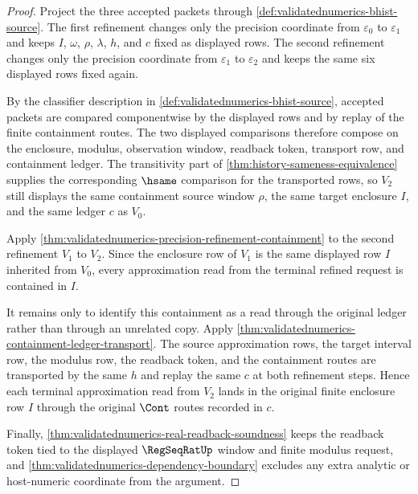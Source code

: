 \begin{proof}
Project the three accepted packets through
\autoref{def:validatednumerics-bhist-source}. The first refinement changes
only the precision coordinate from $\varepsilon_0$ to $\varepsilon_1$ and
keeps $I$, $\omega$, $\rho$, $\lambda$, $h$, and $c$ fixed as displayed rows.
The second refinement changes only the precision coordinate from
$\varepsilon_1$ to $\varepsilon_2$ and keeps the same six displayed rows
fixed again.

By the classifier description in
\autoref{def:validatednumerics-bhist-source}, accepted packets are compared
componentwise by the displayed rows and by replay of the finite containment
routes. The two displayed comparisons therefore compose on the enclosure,
modulus, observation window, readback token, transport row, and containment
ledger. The transitivity part of
\autoref{thm:history-sameness-equivalence} supplies the corresponding
$\hsame$ comparison for the transported rows, so $V_2$ still displays the
same containment source window $\rho$, the same target enclosure $I$, and the
same ledger $c$ as $V_0$.

Apply \autoref{thm:validatednumerics-precision-refinement-containment} to the
second refinement $V_1$ to $V_2$. Since the enclosure row of $V_1$ is the
same displayed row $I$ inherited from $V_0$, every approximation read from
the terminal refined request is contained in $I$.

It remains only to identify this containment as a read through the original
ledger rather than through an unrelated copy. Apply
\autoref{thm:validatednumerics-containment-ledger-transport}. The source
approximation rows, the target interval row, the modulus row, the readback
token, and the containment routes are transported by the same $h$ and replay
the same $c$ at both refinement steps. Hence each terminal approximation read
from $V_2$ lands in the original finite enclosure row $I$ through the
original $\Cont$ routes recorded in $c$.

Finally, \autoref{thm:validatednumerics-real-readback-soundness} keeps the
readback token tied to the displayed $\RegSeqRatUp$ window and finite modulus
request, and \autoref{thm:validatednumerics-dependency-boundary} excludes any
extra analytic or host-numeric coordinate from the argument.
\end{proof}
